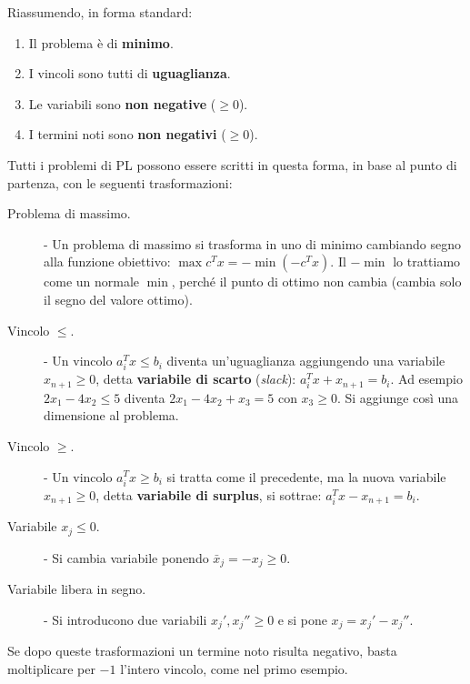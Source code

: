 Riassumendo, in forma standard:
\begin{enumerate}
    \item Il problema è di \textbf{minimo}.
    \item I vincoli sono tutti di \textbf{uguaglianza}.
    \item Le variabili sono \textbf{non negative} ($\ge 0$).
    \item I termini noti sono \textbf{non negativi} ($\ge 0$).
\end{enumerate}
Tutti i problemi di PL possono essere scritti in questa forma, in base al punto di partenza, con le seguenti trasformazioni:
\begin{description}
    \item[Problema di massimo.] - Un problema di massimo si trasforma in uno di minimo cambiando segno alla funzione obiettivo: $\max c^T x = -\min(-c^T x)$. Il $-\min$ lo trattiamo come un normale $\min$, perché il punto di ottimo non cambia (cambia solo il segno del valore ottimo).
    \item[Vincolo $\le$.] - Un vincolo $a_i^T x \le b_i$ diventa un'uguaglianza aggiungendo una variabile $x_{n+1} \ge 0$, detta \textbf{variabile di scarto} (\emph{slack}): $a_i^T x + x_{n+1} = b_i$. Ad esempio $2x_1 - 4x_2 \le 5$ diventa $2x_1 - 4x_2 + x_3 = 5$ con $x_3 \ge 0$. Si aggiunge così una dimensione al problema.
    \item[Vincolo $\ge$.] - Un vincolo $a_i^T x \ge b_i$ si tratta come il precedente, ma la nuova variabile $x_{n+1} \ge 0$, detta \textbf{variabile di surplus}, si sottrae: $a_i^T x - x_{n+1} = b_i$.
    \item[Variabile $x_j \le 0$.] - Si cambia variabile ponendo $\bar{x}_j = -x_j \ge 0$.
    \item[Variabile libera in segno.] - Si introducono due variabili $x_j', x_j'' \ge 0$ e si pone $x_j = x_j' - x_j''$.
\end{description}
Se dopo queste trasformazioni un termine noto risulta negativo, basta moltiplicare per $-1$ l'intero vincolo, come nel primo esempio.

